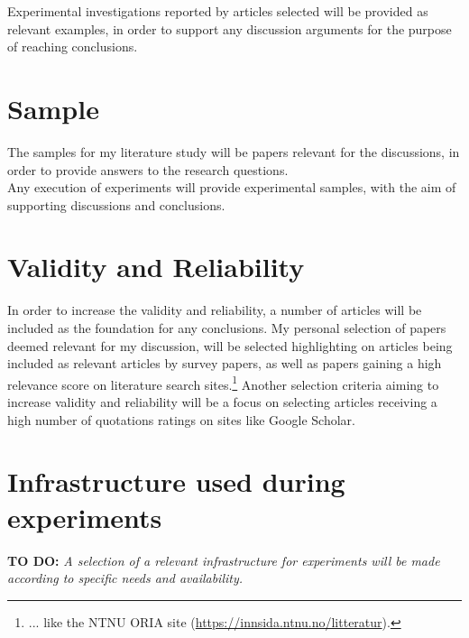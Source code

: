 Experimental investigations reported by articles selected will be provided as relevant examples, in order to support any discussion arguments for the purpose of reaching conclusions.  

\section{Sample}

The samples for my literature study will be papers relevant for the discussions, in order to provide answers to the research questions.\\ 

Any execution of experiments will provide experimental samples, with the aim of supporting discussions and conclusions.
\section{Validity and Reliability}

In order to increase the validity and reliability, a number of articles will be included as the foundation for any conclusions. My personal selection of papers deemed relevant for my discussion, will be selected highlighting on articles being included as relevant articles by survey papers, as well as papers gaining a high relevance score on literature search sites.\footnote{... like the NTNU ORIA site (\url{https://innsida.ntnu.no/litteratur}).} Another selection criteria aiming to increase validity and reliability will be a focus on selecting articles receiving a high number of quotations ratings on sites like Google Scholar. %
\section{Infrastructure used during experiments }
\textbf{TO DO:}
\textit{A selection of a relevant infrastructure for experiments will be made according to  specific needs and availability.  }


